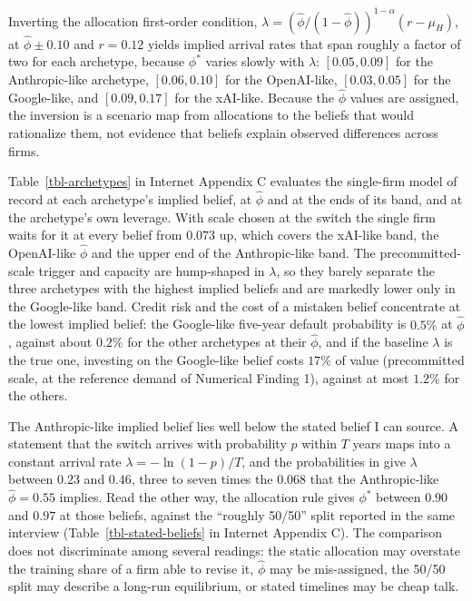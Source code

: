 \documentclass[
  11pt,
  letterpaper,
]{scrartcl}
\begin{document}
Inverting the allocation first-order condition,
\(\lambda = (\hat{\phi}/(1-\hat{\phi}))^{1-\alpha}(r - \mu_H)\), at
\(\hat{\phi} \pm 0.10\) and \(r = 0.12\) yields implied arrival rates
that span roughly a factor of two for each archetype, because \(\phi^*\)
varies slowly with \(\lambda\): \([0.05, 0.09]\) for the Anthropic-like
archetype, \([0.06, 0.10]\) for the OpenAI-like, \([0.03, 0.05]\) for
the Google-like, and \([0.09, 0.17]\) for the xAI-like. Because the
\(\hat{\phi}\) values are assigned, the inversion is a scenario map from
allocations to the beliefs that would rationalize them, not evidence
that beliefs explain observed differences across firms.

Table~\ref{tbl-archetypes} in Internet Appendix C evaluates the
single-firm model of record at each archetype's implied belief, at
\(\hat{\phi}\) and at the ends of its band, and at the archetype's own
leverage. With scale chosen at the switch the single firm waits for it
at every belief from \(0.073\) up, which covers the xAI-like band, the
OpenAI-like \(\hat{\phi}\) and the upper end of the Anthropic-like band.
The precommitted-scale trigger and capacity are hump-shaped in
\(\lambda\), so they barely separate the three archetypes with the
highest implied beliefs and are markedly lower only in the Google-like
band. Credit risk and the cost of a mistaken belief concentrate at the
lowest implied belief: the Google-like five-year default probability is
\(0.5\%\) at \(\hat{\phi}\), against about \(0.2\%\) for the other
archetypes at their \(\hat{\phi}\), and if the baseline \(\lambda\) is
the true one, investing on the Google-like belief costs \(17\%\) of
value (precommitted scale, at the reference demand of Numerical Finding
1), against at most \(1.2\%\) for the others.

The Anthropic-like implied belief lies well below the stated belief I
can source. A statement that the switch arrives with probability \(p\)
within \(T\) years maps into a constant arrival rate
\(\lambda = -\ln(1-p)/T\), and the probabilities in
\citet{amodei2026dwarkesh} give \(\lambda\) between \(0.23\) and
\(0.46\), three to seven times the \(0.068\) that the Anthropic-like
\(\hat{\phi} = 0.55\) implies. Read the other way, the allocation rule
gives \(\phi^*\) between \(0.90\) and \(0.97\) at those beliefs, against
the ``roughly 50/50'' split reported in the same interview
(Table~\ref{tbl-stated-beliefs} in Internet Appendix C). The comparison
does not discriminate among several readings: the static allocation may
overstate the training share of a firm able to revise it, \(\hat{\phi}\)
may be mis-assigned, the 50/50 split may describe a long-run
equilibrium, or stated timelines may be cheap talk.
\end{document}
